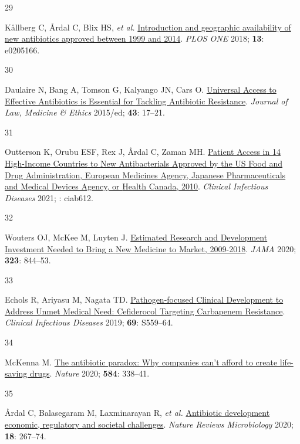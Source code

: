 \documentclass[
  11pt,
  paper=a4,
  ,captions=tableheading
]{scrartcl}
\newlength{\cslhangindent}
\newlength{\csllabelwidth}
\newenvironment{CSLReferences}[2] %
 {%
  \setlength{\parindent}{0pt}
  \ifodd #1 \everypar{\setlength{\hangindent}{\cslhangindent}}\ignorespaces\fi
  \ifnum #2 > 0
  \setlength{\parskip}{#2\baselineskip}
  \fi
 }%
 {}
\newcommand{\CSLLeftMargin}[1]{\parbox[t]{\csllabelwidth}{#1}}
\newcommand{\CSLRightInline}[1]{\parbox[t]{\linewidth - \csllabelwidth}{#1}\break}
\begin{document}
\begin{CSLReferences}{0}{0}
\leavevmode{}%
\CSLLeftMargin{29 }
\CSLRightInline{Kållberg C, Årdal C, Blix HS, \emph{et al.}
\href{https://doi.org/10.1371/journal.pone.0205166}{Introduction and
geographic availability of new antibiotics approved between 1999 and
2014}. \emph{PLOS ONE} 2018; \textbf{13}: e0205166.}

\leavevmode{}%
\CSLLeftMargin{30 }
\CSLRightInline{Daulaire N, Bang A, Tomson G, Kalyango JN, Cars O.
\href{https://doi.org/10.1111/jlme.12269}{Universal {Access} to
{Effective Antibiotics} is {Essential} for {Tackling Antibiotic
Resistance}}. \emph{Journal of Law, Medicine \& Ethics} 2015/ed;
\textbf{43}: 17--21.}

\leavevmode{}%
\CSLLeftMargin{31 }
\CSLRightInline{Outterson K, Orubu ESF, Rex J, Årdal C, Zaman MH.
\href{https://doi.org/10.1093/cid/ciab612}{Patient {Access} in 14
{High-Income Countries} to {New Antibacterials Approved} by the {US
Food} and {Drug Administration}, {European Medicines Agency}, {Japanese
Pharmaceuticals} and {Medical Devices Agency}, or {Health Canada},
2010\textendash 2020}. \emph{Clinical Infectious Diseases} 2021; :
ciab612.}

\leavevmode{}%
\CSLLeftMargin{32 }
\CSLRightInline{Wouters OJ, McKee M, Luyten J.
\href{https://doi.org/10.1001/jama.2020.1166}{Estimated {Research} and
{Development Investment Needed} to {Bring} a {New Medicine} to {Market},
2009-2018}. \emph{JAMA} 2020; \textbf{323}: 844--53.}

\leavevmode{}%
\CSLLeftMargin{33 }
\CSLRightInline{Echols R, Ariyasu M, Nagata TD.
\href{https://doi.org/10.1093/cid/ciz829}{Pathogen-focused {Clinical
Development} to {Address Unmet Medical Need}: {Cefiderocol Targeting
Carbapenem Resistance}}. \emph{Clinical Infectious Diseases} 2019;
\textbf{69}: S559--64.}

\leavevmode{}%
\CSLLeftMargin{34 }
\CSLRightInline{McKenna M.
\href{https://doi.org/10.1038/d41586-020-02418-x}{The antibiotic
paradox: Why companies can't afford to create life-saving drugs}.
\emph{Nature} 2020; \textbf{584}: 338--41.}

\leavevmode{}%
\CSLLeftMargin{35 }
\CSLRightInline{Årdal C, Balasegaram M, Laxminarayan R, \emph{et al.}
\href{https://doi.org/10.1038/s41579-019-0293-3}{Antibiotic development
\textemdash{} economic, regulatory and societal challenges}.
\emph{Nature Reviews Microbiology} 2020; \textbf{18}: 267--74.}


\end{CSLReferences}
\end{document}
